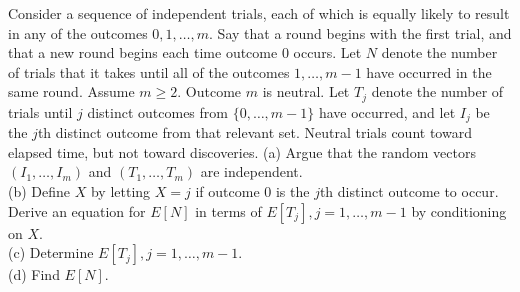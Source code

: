 
\setcounter{exercise}{92}

\begin{exercise}
\label{ex:conditioning-expectation-93}
Consider a sequence of independent trials, each of which is equally likely to result in any of the outcomes $0, 1, \dots, m$. Say that a round begins with the first trial, and that a new round begins each time outcome $0$ occurs. Let $N$ denote the number of trials that it takes until all of the outcomes $1, \dots, m-1$ have occurred in the same round. Assume $m\ge2$. Outcome $m$ is neutral. Let $T_j$ denote the number of trials until $j$ distinct outcomes from $\{0,\ldots,m-1\}$ have occurred, and let $I_j$ be the $j$th distinct outcome from that relevant set. Neutral trials count toward elapsed time, but not toward discoveries.
(a) Argue that the random vectors $(I_1, \dots, I_m)$ and $(T_1, \dots, T_m)$ are independent.\\
(b) Define $X$ by letting $X = j$ if outcome $0$ is the $j$th distinct outcome to occur. Derive an equation for $E[N]$ in terms of $E[T_j], j = 1, \dots, m-1$ by conditioning on $X$.\\
(c) Determine $E[T_j], j = 1, \dots, m-1$.\\
(d) Find $E[N]$.
\end{exercise}

